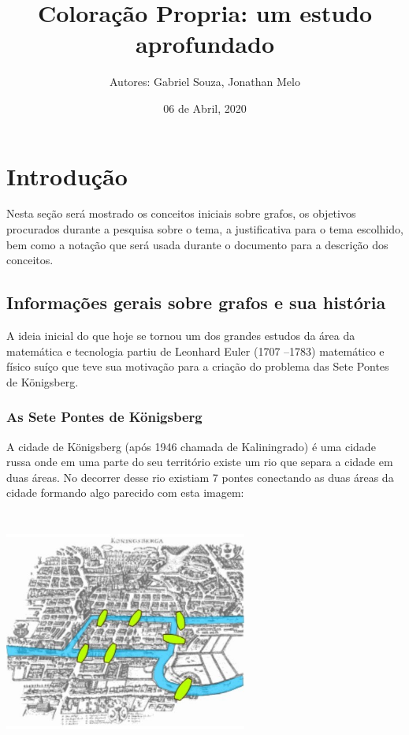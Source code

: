 \documentclass[12pt]{article}
\title{Coloração Propria: um estudo aprofundado}
\author{Autores: Gabriel Souza, Jonathan Melo}
\affil{Orientador: Prof. Celso Aimbiré Weffort Santos }
\date{06 de Abril, 2020}
\begin{document}
	
	\maketitle
	
	
	\section{Introdução}
	Nesta seção será mostrado os conceitos iniciais sobre grafos, os objetivos procurados durante a pesquisa sobre o tema, a justificativa para o tema escolhido, bem como a notação que será usada durante o documento para a descrição dos conceitos.
	
	\subsection{Informações gerais sobre grafos e sua história }
	
	A ideia inicial do que hoje se tornou um dos grandes estudos da área da matemática e tecnologia partiu de Leonhard Euler (1707 –1783) matemático e físico suíço que teve sua motivação para a criação do problema das Sete Pontes de Königsberg.
	
	\subsubsection{As Sete Pontes de Königsberg }
	
	A cidade de Königsberg (após 1946 chamada de Kaliningrado) é uma cidade russa onde em uma parte do seu território existe um rio que separa a cidade em duas áreas. No decorrer desse rio existiam 7 pontes conectando as duas áreas da cidade formando algo parecido com esta imagem:

 
{\centering  \includegraphics[width=8cm, height=8cm]{pontesKonisberg}\par}   
\end{document}
